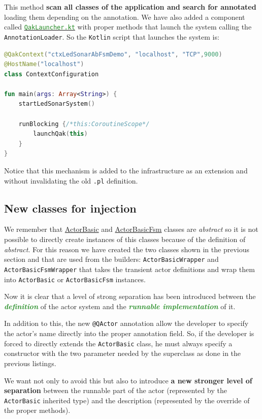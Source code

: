 This method \textbf{scan all classes of the application and search for annotated} loading them depending on the annotation. We have also added a component called \href{https://github.com/LM-96/QA-Extensions/blob/main/it.unibo.qakactor/src/main/kotlin/QakLauncher.kt}{\textcolor{ForestGreen}{\texttt{QakLauncher.kt}}} with proper methods that launch the system calling the \texttt{AnnotationLoader}. So the \texttt{Kotlin} script that launches the system is:

\begin{lstlisting}[caption=\texttt{App.kt} (\texttt{ledsonarsystem0}), language=Kotlin]
@QakContext("ctxLedSonarAbFsmDemo", "localhost", "TCP",9000)
@HostName("localhost")
class ContextConfiguration

fun main(args: Array<String>) {
	startLedSonarSystem()
	
	runBlocking {/*this:CoroutineScope*/
		launchQak(this)
	}
}
\end{lstlisting}

Notice that this mechanism is added to the infrastructure as an extension and without invalidating the old \texttt{.pl} definition. 

\subsection{New classes for injection}

We remember that \href{https://github.com/anatali/issLab2021/blob/main/it.unibo.qakactor/src/main/kotlin/ActorBasic.kt}{ActorBasic} and \href{https://github.com/anatali/issLab2021/blob/main/it.unibo.qakactor/src/main/kotlin/ActorBasicFsm.kt}{ActorBasicFsm} classes are \textit{abstract} so it is not possible to directly create instances of this classes because of the definition of \textit{abstract}.
For this reason we have created the two classes shown in the previous section and that are used from the builders: \texttt{ActorBasicWrapper} and \texttt{ActorBasicFsmWrapper} that takes the transient actor definitions and wrap them into \texttt{ActorBasic} or \texttt{ActorBasicFsm} instances.

Now it is clear that a level of strong separation has been introduced between the \textcolor{ForestGreen}{\textbf{\textit{definition}}} of the actor system and the \textcolor{ForestGreen}{\textbf{\textit{runnable implementation}}} of it.

In addition to this, the new \texttt{@QActor} annotation allow the developer to specify the actor's name directly into the proper annotation field. So, if the developer is forced to directly extends the \texttt{ActorBasic} class, he must always specify a constructor with the two parameter needed by the superclass as done in the previous listings.

We want not only to avoid this but also to introduce \textbf{a new stronger level of separation} between the runnable part of the actor (represented by the \texttt{ActorBasic} inherited type) and the description (represented by the override of the proper methods).
